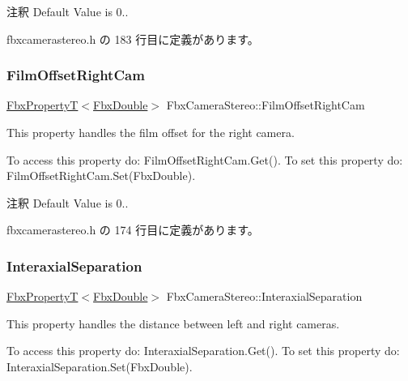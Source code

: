 \begin{DoxyRemark}{注釈}
Default Value is 0.. 
\end{DoxyRemark}


 fbxcamerastereo.\+h の 183 行目に定義があります。

\mbox{\label{class_fbx_camera_stereo_a91f409fc6af89147826e7eb0aae87184}} 
\subsubsection{\texorpdfstring{Film\+Offset\+Right\+Cam}{FilmOffsetRightCam}}
{\footnotesize\ttfamily \hyperlink{class_fbx_property_t}{Fbx\+PropertyT}$<$\hyperlink{fbxtypes_8h_a171e72a1c46fc15c1a6c9c31948c1c5b}{Fbx\+Double}$>$ Fbx\+Camera\+Stereo\+::\+Film\+Offset\+Right\+Cam}

This property handles the film offset for the right camera.

To access this property do\+: Film\+Offset\+Right\+Cam.\+Get(). To set this property do\+: Film\+Offset\+Right\+Cam.\+Set(\+Fbx\+Double).

\begin{DoxyRemark}{注釈}
Default Value is 0.. 
\end{DoxyRemark}


 fbxcamerastereo.\+h の 174 行目に定義があります。

\mbox{\label{class_fbx_camera_stereo_a93f63eb9bb9d1a9829db054abce1289d}} 
\subsubsection{\texorpdfstring{Interaxial\+Separation}{InteraxialSeparation}}
{\footnotesize\ttfamily \hyperlink{class_fbx_property_t}{Fbx\+PropertyT}$<$\hyperlink{fbxtypes_8h_a171e72a1c46fc15c1a6c9c31948c1c5b}{Fbx\+Double}$>$ Fbx\+Camera\+Stereo\+::\+Interaxial\+Separation}

This property handles the distance between left and right cameras.

To access this property do\+: Interaxial\+Separation.\+Get(). To set this property do\+: Interaxial\+Separation.\+Set(\+Fbx\+Double).

